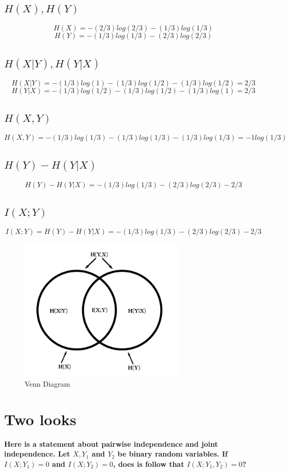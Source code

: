 \documentclass[11pt, oneside]{book}   	%
\begin{document}
\subsection{$H(X), H(Y)$}
$$H(X)=-(2/3)log(2/3)-(1/3)log(1/3)$$
$$H(Y)=-(1/3)log(1/3)-(2/3)log(2/3)$$
\subsection{$H(X|Y), H(Y|X)$}
$$H(X|Y)=-(1/3)log(1)-(1/3)log(1/2)-(1/3)log(1/2)= 2/3$$
$$H(Y|X)=-(1/3)log(1/2)-(1/3)log(1/2)-(1/3)log(1)= 2/3$$
\subsection{$H(X,Y)$}
$$H(X,Y)=-(1/3)log(1/3)-(1/3)log(1/3)-(1/3)log(1/3) = -1log(1/3)$$
\subsection{$H(Y)-H(Y|X)$}
$$H(Y)-H(Y|X)=-(1/3)log(1/3)-(2/3)log(2/3)-2/3$$
\subsection{$I(X;Y)$}
$$I(X;Y)=H(Y)-H(Y|X)=-(1/3)log(1/3)-(2/3)log(2/3)-2/3$$

\begin{figure}[h!]
	\includegraphics[width=8cm]{VennDiagram}
	\centering
	\caption{Venn Diagram}
\end{figure}

\section{Two looks}
\textbf{Here is a statement about pairwise independence and joint independence.  Let $X,Y_1$ and $Y_2$ be binary random variables.  If $I(X;Y_1)=0$ and $I(X;Y_2)=0$, does is follow that $I(X;Y_1,Y_2)=0$?}
\end{document}
